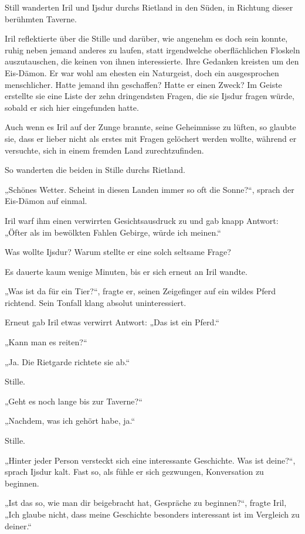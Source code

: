 Still wanderten Iril und Ijsdur durchs Rietland in den Süden, in Richtung dieser berühmten Taverne.

Iril reflektierte über die Stille und darüber, wie angenehm es doch sein konnte, ruhig neben jemand anderes zu laufen, statt irgendwelche oberflächlichen Floskeln auszutauschen, die keinen von ihnen interessierte. Ihre Gedanken kreisten um den Eis-Dämon. Er war wohl am ehesten ein Naturgeist, doch ein ausgesprochen menschlicher. Hatte jemand ihn geschaffen? Hatte er einen Zweck? Im Geiste erstellte sie eine Liste der zehn dringendsten Fragen, die sie Ijsdur fragen würde, sobald er sich hier eingefunden hatte.

Auch wenn es Iril auf der Zunge brannte, seine Geheimnisse zu lüften, so glaubte sie, dass er lieber nicht als erstes mit Fragen gelöchert werden wollte, während er versuchte, sich in einem fremden Land zurechtzufinden.

So wanderten die beiden in Stille durchs Rietland.

„Schönes Wetter. Scheint in diesen Landen immer so oft die Sonne?“, sprach der Eis-Dämon auf einmal.

Iril warf ihm einen verwirrten Gesichtsausdruck zu und gab knapp Antwort: „Öfter als im bewölkten Fahlen Gebirge, würde ich meinen.“

Was wollte Ijsdur? Warum stellte er eine solch seltsame Frage?

Es dauerte kaum wenige Minuten, bis er sich erneut an Iril wandte.

„Was ist da für ein Tier?“, fragte er, seinen Zeigefinger auf ein wildes Pferd richtend. Sein Tonfall klang absolut uninteressiert.

Erneut gab Iril etwas verwirrt Antwort: „Das ist ein Pferd.“

„Kann man es reiten?“

„Ja. Die Rietgarde richtete sie ab.“

Stille.

„Geht es noch lange bis zur Taverne?“

„Nachdem, was ich gehört habe, ja.“

Stille.

„Hinter jeder Person versteckt sich eine interessante Geschichte. Was ist deine?“, sprach Ijsdur kalt. Fast so, als fühle er sich gezwungen, Konversation zu beginnen.

„Ist das so, wie man dir beigebracht hat, Gespräche zu beginnen?“, fragte Iril, „Ich glaube nicht, dass meine Geschichte besonders interessant ist im Vergleich zu deiner.“

